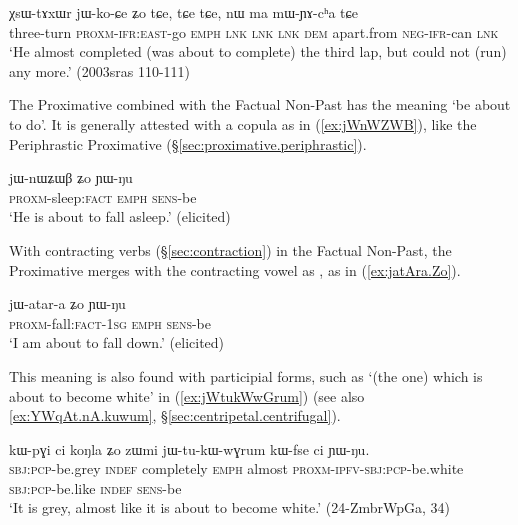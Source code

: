 \begin{exe}
\ex \label{ex:XsWtAxWr.jikoCe}
\gll  χsɯ-tɤxɯr jɯ-ko-ɕe ʑo tɕe,  tɕe tɕe, nɯ ma mɯ-ɲɤ-cʰa tɕe \\
three-turn \textsc{proxm}-\textsc{ifr}:\textsc{east}-go \textsc{emph} \textsc{lnk} \textsc{lnk} \textsc{lnk} \textsc{dem} apart.from \textsc{neg}-\textsc{ifr}-can \textsc{lnk} \\
\glt `He almost completed (was about to complete) the third lap, but could not (run) any more.' (2003sras 110-111)
\end{exe}

The Proximative combined with the Factual Non-Past has the meaning `be about to do'. It is generally attested with a copula as in (\ref{ex:jWnWZWB}), like the Periphrastic Proximative (§\ref{sec:proximative.periphrastic}). 

\begin{exe}
\ex \label{ex:jWnWZWB}
\gll jɯ-nɯʑɯβ ʑo ɲɯ-ŋu \\
\textsc{proxm}-sleep:\textsc{fact} \textsc{emph} \textsc{sens}-be \\
\glt `He is about to fall asleep.' (elicited)
\end{exe}

With contracting verbs (§\ref{sec:contraction}) in the Factual Non-Past, the Proximative merges with the contracting vowel as , as in (\ref{ex:jatAra.Zo}).

\begin{exe}
\ex \label{ex:jatAra.Zo}
\gll jɯ-atar-a ʑo ɲɯ-ŋu \\
\textsc{proxm}-fall:\textsc{fact}-\textsc{1sg} \textsc{emph} \textsc{sens}-be \\
\glt `I am about to fall down.' (elicited)
\end{exe}


This meaning is also found with participial forms, such as  `(the one) which is about to become white' in (\ref{ex:jWtukWwGrum}) (see also \ref {ex:YWqAt.nA.kuwum}, §\ref{sec:centripetal.centrifugal}).
 
 \begin{exe} 
\ex \label{ex:jWtukWwGrum}
\gll  kɯ-pɣi ci koŋla ʑo zɯmi jɯ-tu-kɯ-wɣrum kɯ-fse ci ɲɯ-ŋu.  \\
\textsc{sbj}:\textsc{pcp}-be.grey \textsc{indef} completely \textsc{emph} almost \textsc{proxm}-\textsc{ipfv}-\textsc{sbj}:\textsc{pcp}-be.white \textsc{sbj}:\textsc{pcp}-be.like \textsc{indef} \textsc{sens}-be \\
\glt `It is grey, almost like it is about to become white.'  (24-ZmbrWpGa, 34)
\end{exe}

